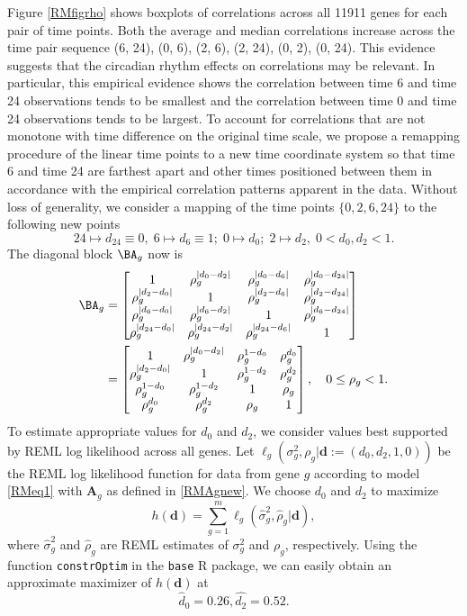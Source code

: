 Figure \ref{RMfigrho} shows boxplots of correlations  across all 11911 genes for each pair of time points. Both the average  and median correlations increase across the time pair sequence  (6, 24), (0, 6), (2, 6), (2, 24), (0, 2), (0, 24). This evidence suggests that the circadian rhythm effects on  correlations may be relevant.  In particular, this empirical evidence shows the correlation between time 6 and time 24 observations tends to be  smallest and the correlation between time 0 and time 24 observations tends to be largest. To account for  correlations that are not monotone with time difference on the original time scale,  we propose a remapping procedure of the linear time points to a new time coordinate system so that time 6 and time 24 are farthest apart and other times positioned between them in accordance with the empirical correlation patterns apparent in the data. Without loss of  generality, we consider a mapping of the time points $\{0, 2, 6, 24\}$ to the following new points
\[
24 \mapsto d_{24}\equiv 0, \;  6 \mapsto d_6\equiv 1;\; 0 \mapsto d_{0}; \; 2 \mapsto d_{2}, \; 0<d_0,  d_2 < 1.
\]
The diagonal block $\BA_g$ now is
\begin{align}\label{RMAgnew}
\BA_g & =
\begin{bmatrix}
1 &  \rho_g^{|d_0 -d_2|}  & \rho_g^{|d_0 -d_6|} & \rho_g^{|d_0 - d_{24}|}\\
 \rho_g^{|d_2 -d_0|}   &  1 & \rho_g^{|d_2 -d_6|} & \rho_g^{|d_2 - d_{24}|}\\
\rho_g^{|d_6 -d_0|} & \rho_g^{|d_6 -d_2|} & 1 & \rho_g^{|d_6 - d_{24}|}\\
\rho_g^{|d_{24} - d_0|}  &   \rho_g^{|d_{24} - d_2|}   &\rho_g^{|d_{24} - d_6|} & 1
\end{bmatrix}\\
 & =
\begin{bmatrix}
1 &  \rho_g^{|d_0 -d_2|}  & \rho_g^{1-d_0 } & \rho_g^{d_0}\\
 \rho_g^{|d_2 -d_0|}   &  1 & \rho_g^{1- d_2} & \rho_g^{d_2}\\
\rho_g^{1 -d_0} & \rho_g^{1 -d_2} & 1 & \rho_g\\
\rho_g^{d_0}  &   \rho_g^{d_2}   &\rho_g & 1
\end{bmatrix},
\quad 0 \leq \rho_g < 1.
\end{align}
To estimate appropriate values for $d_0$ and $d_2$, we consider values best supported by REML log likelihood across all genes.
Let $\ell_g(\sigma^2_g, \rho_g|\boldsymbol{d}:=(d_0, d_2, 1, 0))$ be the REML log likelihood function for data from gene $g$  according to model \eqref{RMeq1} with $\boldsymbol{A}_g$ as defined in \eqref{RMAgnew}. We choose $d_0$ and  $d_2$ to maximize
\[
h(\boldsymbol{d}) = \sum_{g = 1}^m \ell_g(\widehat{\sigma}_g^2, \widehat{\rho}_g|\boldsymbol{d}),
\]
where $\widehat{\sigma}_g^2$ and  $\widehat{\rho}_g$ are REML estimates of $\sigma^2_g$ and  $\rho_g$, respectively. Using the function \texttt{constrOptim} in the  \texttt{base} R package, we can easily obtain an approximate maximizer of $h(\boldsymbol{d})$ at
\[
\hat{d}_0 = 0.26, \hat{d_2} = 0.52.
\]

